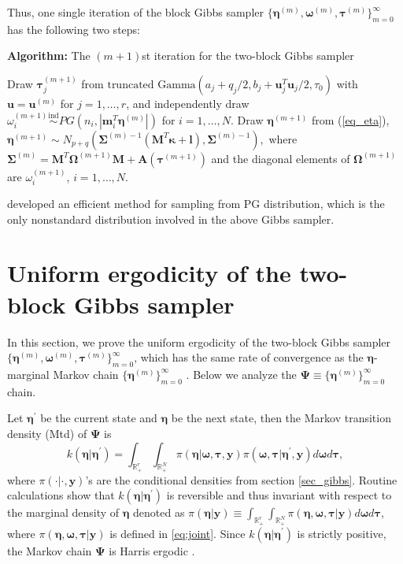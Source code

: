 \documentclass[11pt,a4paper]{article}
\begin{document}
Thus, one single iteration of the block Gibbs sampler $\{\bm{\eta}^{(m)}, \bm{\omega}^{(m)}, \bm{\tau}^{(m)}\}_{m=0}^{\infty}$ has the following two steps:

\begin{algorithm}[H]
	\caption*{{\bf{Algorithm}:} The $(m+1)$st iteration for the two-block Gibbs sampler}
	\begin{algorithmic}[1]
		\STATE Draw $\bm{\tau}_j^{(m+1)}$ from $\text{truncated Gamma}\left(a_{j}+q_{j}/2,b_{j}+\bm{u}_{j}^{T}\bm{u}_{j}/2,\tau_0\right)$ with $\bm{u} =\bm{u}^{(m)}$ for $j=1,\dots, r$, and independently draw $\omega_{i}^{(m+1)} \overset{\text{ind}}\sim  PG\left(n_i,|\bm{m}_{i}^{T}\bm{\eta}^{(m)}|\right)$ for  $i=1,\dots, N$.
		\STATE Draw $\bm{\eta}^{(m+1)}$ from (\ref{eq_eta}),  $\bm{\eta}^{(m+1)} \sim N_{p+q}\left( \bm{\Sigma}^{(m)-1}\left(\bm{M}^{T}\bm{\kappa}+\bm{l}\right),\bm{\Sigma}^{(m)-1}\right),$
where $\bm{\Sigma}^{(m)} = \bm{M}^{T}\bm{\Omega}^{(m+1)}\bm{M}+\bm{A}(\bm{\tau}^{(m+1)})$  and the diagonal elements of $\bm{\Omega}^{(m+1)}$ are $\omega_{i}^{(m+1)}$, $i=1,\dots,N$.
	\end{algorithmic}
\end{algorithm}

\cite{polson2013bayesian} developed an efficient method for sampling from PG distribution, which is the only nonstandard distribution involved in the above Gibbs sampler.

\section{Uniform ergodicity of the two-block Gibbs sampler }
\label{sec_proof}

In this section, we prove the uniform ergodicity of the two-block Gibbs sampler $\{\bm{\eta}^{(m)}, \bm{\omega}^{(m)}, \bm{\tau}^{(m)}\}_{m=0}^{\infty}$, which has the same rate of convergence
as the $\bm{\eta}$-marginal Markov chain $\{\bm{\eta}^{(m)}\}_{m=0}^{\infty}$
\citep{robe:rose:2001}. Below we analyze the $\bm{\Psi} \equiv \{\bm{\eta}^{(m)}\}_{m=0}^{\infty}$ chain.

Let $\bm{\eta}^{\prime}$ be the current state and $\bm{\eta}$ be the
next state, then the Markov transition density (Mtd) of $\bm{\Psi}$ is
\begin{equation}
\label{eq_mtd}
k(\bm{\eta}|\bm{\eta}^{\prime}) =  \int_{\mathbb{R}_+^r} \int_{\mathbb{R}_+^N} \pi(\bm{\eta}|\bm{\omega},\bm{\tau},\bm{y})\pi(\bm{\omega},\bm{\tau}|\bm{\eta}^{\prime},\bm{y})d\bm{\omega}d\bm{\tau},
\end{equation}
where $\pi(\cdot|\cdot,\bm{y})$'s are the conditional densities from section \ref{sec_gibbs}. Routine calculations show that
$k(\bm{\eta}|\bm{\eta}^{\prime})$ is reversible and thus invariant with respect to the marginal density of $\bm{\eta}$ denoted as $\pi(\bm{\eta}|\bm{y}) \equiv \int_{\mathbb{R}_+^r} \int_{\mathbb{R}_{+}^{N}} \pi(\bm{\eta},\bm{\omega},\bm{\tau}|\bm{y})d\bm{\omega}d\bm{\tau}$, where $\pi(\bm{\eta},\bm{\omega},\bm{\tau}|\bm{y})$ is defined in \eqref{eq:joint}. Since $k(\bm{\eta}|\bm{\eta}^{\prime})$ is strictly positive,  the Markov chain $\bm{\Psi}$ is Harris ergodic \citep{hobert2011data}.
\end{document}
